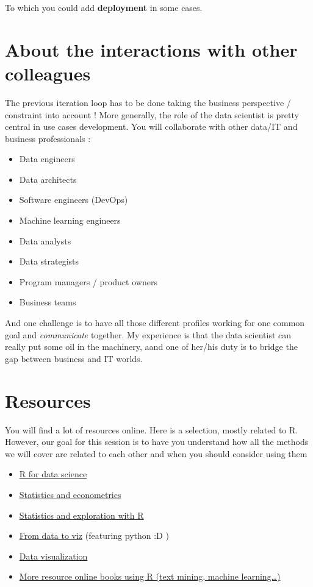 \documentclass[
]{book}
\providecommand{\tightlist}{%
  \setlength{\itemsep}{0pt}\setlength{\parskip}{0pt}}
\begin{document}
To which you could add \textbf{deployment} in some cases.

\hypertarget{about-the-interactions-with-other-colleagues}{%
\section{About the interactions with other colleagues}\label{about-the-interactions-with-other-colleagues}}

The previous iteration loop has to be done taking the business perspective / constraint into account !
More generally, the role of the data scientist is pretty central in use cases development. You will collaborate with other data/IT and business professionals :

\begin{itemize}
\item
  Data engineers
\item
  Data architects
\item
  Software engineers (DevOps)
\item
  Machine learning engineers
\item
  Data analysts
\item
  Data strategists
\item
  Program managers / product owners
\item
  Business teams
\end{itemize}

And one challenge is to have all those different profiles working for one common goal and \emph{communicate} together. My experience is that the data scientist can really put some oil in the machinery, aand one of her/his duty is to bridge the gap between business and IT worlds.

\hypertarget{resources}{%
\section{Resources}\label{resources}}

You will find a lot of resources online. Here is a selection, mostly related to R. However, our goal for this session is to have you understand how all the methods we will cover are related to each other and when you should consider using them

\begin{itemize}
\tightlist
\item
  \href{https://r4ds.had.co.nz/}{R for data science}
\item
  \href{https://www.econometrics-with-r.org/}{Statistics and econometrics}
\item
  \href{https://moderndive.com/}{Statistics and exploration with R}
\item
  \href{https://www.data-to-viz.com/}{From data to viz} (featuring python :D )
\item
  \href{https://socviz.co/}{Data visualization}
\item
  \href{https://bookdown.org/home/}{More resource online books using R (text mining, machine learning\ldots)}
\end{itemize}
\end{document}
